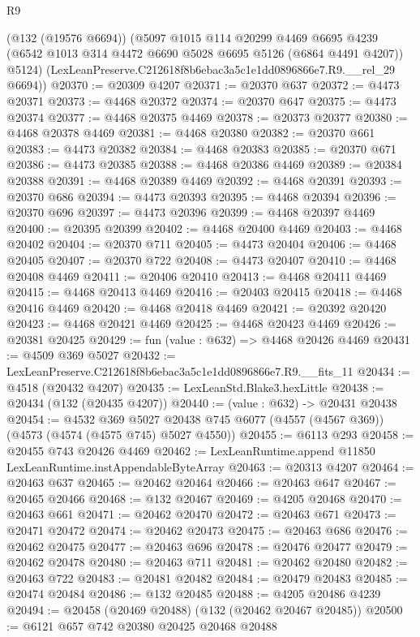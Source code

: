 \begin{lexlean}{R9}
\begin{coremodule}
      (@132 (@19576 @6694))
      (@5097
        @1015
        @114
        @20299
        @4469
        @6695
        @4239
        (@6542 @1013 @314 @4472 @6690 @5028 @6695 @5126 (@6864 @4491 @4207))
        @5124)
      (LexLeanPreserve.C212618f8b6ebac3a5c1e1dd0896866e7.R9.__rel_29 @6694))
@20370 := @20309 @4207
@20371 := @20370 @637
@20372 := @4473 @20371
@20373 := @4468 @20372
@20374 := @20370 @647
@20375 := @4473 @20374
@20377 := @4468 @20375 @4469
@20378 := @20373 @20377
@20380 := @4468 @20378 @4469
@20381 := @4468 @20380
@20382 := @20370 @661
@20383 := @4473 @20382
@20384 := @4468 @20383
@20385 := @20370 @671
@20386 := @4473 @20385
@20388 := @4468 @20386 @4469
@20389 := @20384 @20388
@20391 := @4468 @20389 @4469
@20392 := @4468 @20391
@20393 := @20370 @686
@20394 := @4473 @20393
@20395 := @4468 @20394
@20396 := @20370 @696
@20397 := @4473 @20396
@20399 := @4468 @20397 @4469
@20400 := @20395 @20399
@20402 := @4468 @20400 @4469
@20403 := @4468 @20402
@20404 := @20370 @711
@20405 := @4473 @20404
@20406 := @4468 @20405
@20407 := @20370 @722
@20408 := @4473 @20407
@20410 := @4468 @20408 @4469
@20411 := @20406 @20410
@20413 := @4468 @20411 @4469
@20415 := @4468 @20413 @4469
@20416 := @20403 @20415
@20418 := @4468 @20416 @4469
@20420 := @4468 @20418 @4469
@20421 := @20392 @20420
@20423 := @4468 @20421 @4469
@20425 := @4468 @20423 @4469
@20426 := @20381 @20425
@20429 := fun (value : @632) => @4468 @20426 @4469
@20431 := @4509 @369 @5027
@20432 := LexLeanPreserve.C212618f8b6ebac3a5c1e1dd0896866e7.R9.__fits_11
@20434 := @4518 (@20432 @4207)
@20435 := LexLeanStd.Blake3.hexLittle
@20438 := @20434 (@132 (@20435 @4207))
@20440 := (value : @632) -> @20431 @20438
@20454 := @4532
    @369
    @5027
    @20438
    @745
    @6077
    (@4557 (@4567 @369))
    (@4573 (@4574 (@4575 @745) @5027 @4550))
@20455 := @6113 @293
@20458 := @20455 @743 @20426 @4469
@20462 := LexLeanRuntime.append @11850 LexLeanRuntime.instAppendableByteArray
@20463 := @20313 @4207
@20464 := @20463 @637
@20465 := @20462 @20464
@20466 := @20463 @647
@20467 := @20465 @20466
@20468 := @132 @20467
@20469 := @4205 @20468
@20470 := @20463 @661
@20471 := @20462 @20470
@20472 := @20463 @671
@20473 := @20471 @20472
@20474 := @20462 @20473
@20475 := @20463 @686
@20476 := @20462 @20475
@20477 := @20463 @696
@20478 := @20476 @20477
@20479 := @20462 @20478
@20480 := @20463 @711
@20481 := @20462 @20480
@20482 := @20463 @722
@20483 := @20481 @20482
@20484 := @20479 @20483
@20485 := @20474 @20484
@20486 := @132 @20485
@20488 := @4205 @20486 @4239
@20494 := @20458 (@20469 @20488) (@132 (@20462 @20467 @20485))
@20500 := @6121 @657 @742 @20380 @20425 @20468 @20488

\end{coremodule}
\end{lexlean}
